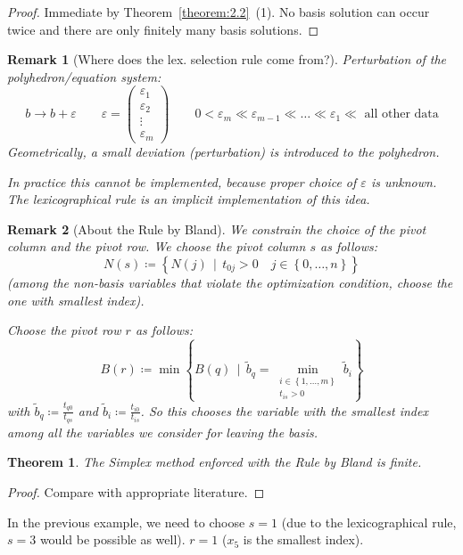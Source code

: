 \documentclass[a4paper]{article}
\newcounter{lecref}[subsection]
\numberwithin{lecref}{subsection}
\newtheorem{theorem}[lecref]{Theorem}
\newtheorem*{Remark}{Remark}
\newcommand{\Set}[1]{\left\{#1\right\}}
\newcommand{\SetDef}[2]{\left\{#1\,\mid\,#2\right\}}
\begin{document}
\begin{proof}
	Immediate by Theorem~\ref{theorem:2.2}~(1). No basis solution can occur twice and there are only finitely many basis solutions.
\end{proof}

\begin{Remark}[Where does the lex. selection rule come from?]
	Perturbation of the polyhedron/equation system:
	\[ b \to b+\varepsilon \qquad \varepsilon = \begin{pmatrix} \varepsilon_1 \\ \varepsilon_2 \\ \vdots \\ \varepsilon_m \end{pmatrix} \qquad 0 < \varepsilon_m \ll \varepsilon_{m-1} \ll \dots \ll \varepsilon_1 \ll \text{ all other data} \]
	Geometrically, a small deviation (perturbation) is introduced to the polyhedron.

	In practice this cannot be implemented, because proper choice of $\varepsilon$ is unknown.
	The lexicographical rule is an implicit implementation of this idea.
\end{Remark}

\begin{Remark}[About the Rule by Bland]
	We constrain the choice of the pivot column and the pivot row. We choose the pivot column $s$ as follows:
	\[ N(s) \coloneqq \SetDef{N(j)}{t_{0j} > 0 \quad j \in \Set{0, \dots, n}} \]
	(among the non-basis variables that violate the optimization condition, choose the one with smallest index).

	Choose the pivot row $r$ as follows:
	\[ B(r) \coloneqq \min\SetDef{B(q)}{\tilde b_q = \min_{\substack{i \in \Set{1, \dots, m} \\ t_{is} > 0}} \tilde b_i} \]
	with $\tilde b_q \coloneqq \frac{t_{q0}}{t_{qs}}$ and $\tilde b_i \coloneqq \frac{t_{i0}}{t_{is}}$.
	So this chooses the variable with the smallest \emph{index} among all the variables we consider for leaving the basis.
\end{Remark}

\begin{theorem}
	\label{theorem:2.4}
	The Simplex method enforced with the Rule by Bland is finite.
\end{theorem}

\begin{proof}
	Compare with appropriate literature.
\end{proof}

In the previous example, we need to choose $s = 1$ (due to the lexicographical rule, $s = 3$ would be possible as well).
$r = 1$ ($x_5$ is the smallest index).
\end{document}
